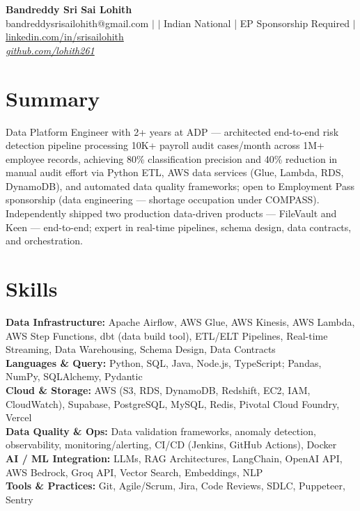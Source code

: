 \documentclass[10pt,letterpaper]{article}
\newcommand{\skillrow}[2]{\textbf{#1:} #2 \\[1pt]}
\begin{document}
\begin{center}
  {\Huge\bfseries Bandreddy Sri Sai Lohith}\\[3pt]
  \small bandreddysrisailohith@gmail.com $\vert$ $\vert$\; Indian National | EP Sponsorship Required $\vert$\; \href{https://linkedin.com/in/srisailohith}{linkedin.com/in/srisailohith} \\[2pt]
  \small\textit{\href{https://github.com/lohith261}{github.com/lohith261}}
\end{center}

\section{Summary}

Data Platform Engineer with 2+ years at ADP --- architected end-to-end risk detection pipeline processing 10K+ payroll audit cases/month across 1M+ employee records, achieving 80\% classification precision and 40\% reduction in manual audit effort via Python ETL, AWS data services (Glue, Lambda, RDS, DynamoDB), and automated data quality frameworks; open to Employment Pass sponsorship (data engineering --- shortage occupation under COMPASS).
      Independently shipped two production data-driven products --- FileVault and Keen --- end-to-end; expert in real-time pipelines, schema design, data contracts, and orchestration.

\section{Skills}

\skillrow{Data Infrastructure}{Apache Airflow, AWS Glue, AWS Kinesis, AWS Lambda, AWS Step Functions, dbt (data build tool), ETL/ELT Pipelines, Real-time Streaming, Data Warehousing, Schema Design, Data Contracts}
\skillrow{Languages \& Query}{Python, SQL, Java, Node.js, TypeScript; Pandas, NumPy, SQLAlchemy, Pydantic}
\skillrow{Cloud \& Storage}{AWS (S3, RDS, DynamoDB, Redshift, EC2, IAM, CloudWatch), Supabase, PostgreSQL, MySQL, Redis, Pivotal Cloud Foundry, Vercel}
\skillrow{Data Quality \& Ops}{Data validation frameworks, anomaly detection, observability, monitoring/alerting, CI/CD (Jenkins, GitHub Actions), Docker}
\skillrow{AI / ML Integration}{LLMs, RAG Architectures, LangChain, OpenAI API, AWS Bedrock, Groq API, Vector Search, Embeddings, NLP}
\skillrow{Tools \& Practices}{Git, Agile/Scrum, Jira, Code Reviews, SDLC, Puppeteer, Sentry}
\end{document}
